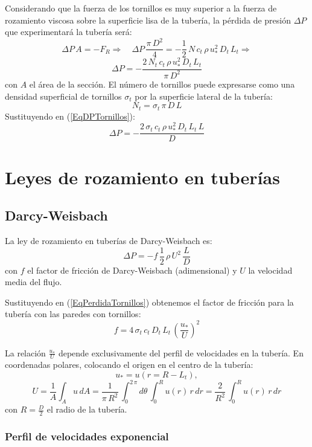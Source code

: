 \documentclass[a4paper]{article}
\newcommand{\EQ}[2]{\begin{equation}#1\label{#2}\end{equation}}
\begin{document}
Considerando que la fuerza de los tornillos es muy superior a la fuerza de
rozamiento viscosa sobre la superficie lisa de la tubería, la pérdida de presión
$\Delta P$ que experimentará la tubería será:
\[
  \Delta P\,A=-F_R\Rightarrow\quad
  \Delta P\,\frac{\pi\,D^2}{4}=-\frac12\,N\,c_t\,\rho\,u_*^2\,D_t\,L_t
  \Rightarrow
\]
\EQ{\Delta P=-\frac{2\,N_t\,c_t\,\rho\,u_*^2\,D_t\,L_t}{\pi\,D^2}}
{EqDPTornillos}
con $A$ el área de la sección. El número de tornillos puede expresarse como una
densidad superficial de tornillos $\sigma_t$ por la superficie lateral de la
tubería:
\EQ{N_t=\sigma_t\,\pi\,D\,L}{EqDensidadTornillos}
Sustituyendo en (\ref{EqDPTornillos}):
\EQ{\Delta P=-\frac{2\,\sigma_t\,c_t\,\rho\,u_*^2\,D_t\,L_t\,L}{D}}
{EqPerdidaTornillos}

\section{Leyes de rozamiento en tuberías}

\subsection{Darcy-Weisbach}

La ley de rozamiento en tuberías de Darcy-Weisbach es:
\EQ{\Delta P=-f\,\frac12\,\rho\,U^2\,\frac{L}{D}}{EqDarcyWeisbach}
con $f$ el factor de fricción de Darcy-Weisbach (adimensional) y $U$ la
velocidad media del flujo.

Sustituyendo en (\ref{EqPerdidaTornillos}) obtenemos el factor de fricción para
la tubería con las paredes con tornillos:
\EQ{f=4\,\sigma_t\,c_t\,D_t\,L_t\,\left(\frac{u_*}{U}\right)^2}
{EqDarcyWeisbachTornillos}

La relación $\frac{u_*}{U}$ depende exclusivamente del perfil de velocidades en
la tubería. En coordenadas polares, colocando el origen en el centro de la
tubería:
\[u_*=u\left(r=R-L_t\right),\]
\EQ
{
  U=\frac{1}{A}\int_Au\,dA=\frac1{\pi\,R^2}\,\int_0^{2\,\pi}d\theta\,
  \int_0^Ru(r)\,r\,dr=\frac2{R^2}\,\int_0^Ru(r)\,r\,dr
}{EqU}
con $R=\frac{D}{2}$ el radio de la tubería.

\subsubsection{Perfil de velocidades exponencial}
\end{document}

